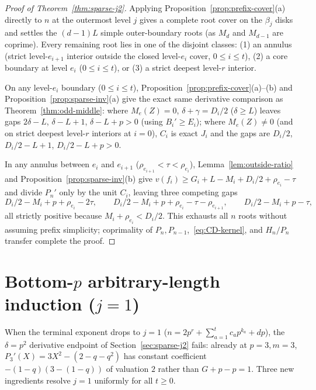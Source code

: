 \documentclass[11pt,reqno]{amsart}
\numberwithin{equation}{section}
\theoremstyle{definition}
\theoremstyle{remark}
\begin{document}
\begin{proof}[Proof of Theorem~\ref{thm:sparse-j2}]
Applying Proposition~\ref{prop:prefix-cover}(a) directly to $n$ at the outermost level $j$ gives a complete root cover on the $\beta_j$ disks and settles the $(d-1)L$ simple outer-boundary roots (as $M_d$ and $M_{d-1}$ are coprime). Every remaining root lies in one of the disjoint classes: (1) an annulus (strict level-$e_{i+1}$ interior outside the closed level-$e_i$ cover, $0\le i\le t$), (2) a core boundary at level $e_i$ ($0\le i\le t$), or (3) a strict deepest level-$r$ interior.

On any level-$e_i$ boundary ($0\le i\le t$), Proposition~\ref{prop:prefix-cover}(a)--(b) and Proposition~\ref{prop:sparse-inv}(a) give the exact same derivative comparison as Theorem~\ref{thm:odd-middle}: where $M_{e}(Z)=0$, $\delta+\gamma=D_i/2$ ($\delta\ge L$) leaves gaps $2\delta-L$, $\delta-L+1$, $\delta-L+p > 0$ (using $B_i'\ge E_i$); where $M_e(Z)\ne 0$ (and on strict deepest level-$r$ interiors at $i=0$), $C_i$ is exact $J_i$ and the gaps are $D_i/2$, $D_i/2-L+1$, $D_i/2-L+p > 0$.

In any annulus between $e_i$ and $e_{i+1}$ ($\rho_{e_{i+1}}<\tau<\rho_{e_i}$), Lemma~\ref{lem:outside-ratio} and Proposition~\ref{prop:sparse-inv}(b) give $v(f_i)\ge G_i+L-M_i+D_i/2+\rho_{e_i}-\tau$ and divide $P_n'$ only by the unit $C_i$, leaving three competing gaps
\begin{equation}
\label{eq:annulus-gaps}
D_i/2 - M_i + p + \rho_{e_i} - 2\tau,\qquad D_i/2 - M_i + p + \rho_{e_i} - \tau - \rho_{e_{i+1}},\qquad D_i/2 - M_i + p - \tau,
\end{equation}
all strictly positive because $M_i+\rho_{e_i} < D_i/2$. This exhausts all $n$ roots without assuming prefix simplicity; coprimality of $P_n, P_{n-1}$,~\eqref{eq:CD-kernel}, and $H_n/P_n$ transfer complete the proof.
\end{proof}

\section{Bottom-$p$ arbitrary-length induction ($j=1$)}
\label{sec:sparse-bottom}

When the terminal exponent drops to $j=1$ ($n = 2p^r + \sum_{a=1}^t c_a p^{k_a} + dp$), the $\delta=p^2$ derivative endpoint of Section~\ref{sec:sparse-j2} fails: already at $p=3, m=3$, $P_3'(X) = 3X^2 - (2-q-q^2)$ has constant coefficient $-(1-q)(3-(1-q))$ of valuation $2$ rather than $G+p-p=1$. Three new ingredients resolve $j=1$ uniformly for all $t\ge 0$.
\end{document}

